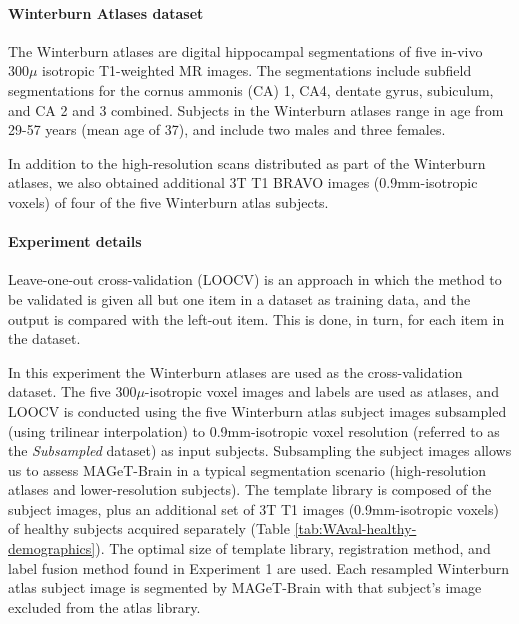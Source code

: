 \documentclass{article}\usepackage{graphicx, color}
\newcommand{\mb}{MAGeT-Brain }
\begin{document}
\paragraph{Winterburn Atlases dataset} 
The Winterburn atlases \citep{Winterburn2013} are digital hippocampal
segmentations of five in-vivo $300\mu$ isotropic T1-weighted MR images. The
segmentations include subfield segmentations for the cornus ammonis (CA) 1, CA4,
dentate gyrus, subiculum, and CA 2 and 3 combined. Subjects in the Winterburn
atlases range in age from 29-57 years (mean age of 37), and include two males
and three females.  

In addition to the high-resolution scans distributed as part of the Winterburn
atlases, we also obtained additional 3T T1 BRAVO images (0.9mm-isotropic voxels)
of four of the five Winterburn atlas subjects. 

\paragraph{Experiment details} 
Leave-one-out cross-validation (LOOCV) is an approach in which the method to be
validated is given all but one item in a dataset as training data, and the
output is compared with the left-out item. This is done, in turn, for each item
in the dataset. 

In this experiment the Winterburn atlases are used as the cross-validation
dataset.  The five $300\mu$-isotropic voxel images and labels are used as
atlases, and LOOCV is conducted using the five Winterburn atlas subject images
subsampled (using trilinear interpolation) to 0.9mm-isotropic voxel resolution
(referred to as the {\em Subsampled} dataset) as input subjects. Subsampling the
subject images allows us to assess \mb in a typical segmentation scenario
(high-resolution atlases and lower-resolution subjects).  The template library
is composed of the subject images, plus an additional set of 3T T1 images
(0.9mm-isotropic voxels) of healthy subjects acquired separately (Table
\ref{tab:WAval-healthy-demographics}). The optimal size of template library,
registration method, and label fusion method found in Experiment 1 are used.
Each resampled Winterburn atlas subject image is segmented by \mb with that
subject's image excluded from the atlas library.
\end{document}
